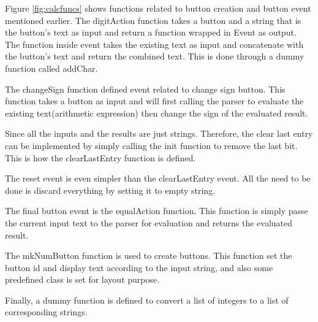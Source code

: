 \documentclass{article}
\begin{document}
\begin{normalsize}
  Figure \ref{fig:calcfuncs} shows functions related to button creation and button event mentioned earlier. The digitAction function takes a button and a string that is the button's text as input and return a function wrapped in Event as output. The function inside event takes the existing text as input and concatenate with the button's text and return the combined text. This is done through a dummy function called addChar.

  The changeSign function defined event related to change sign button. This function takes a button as input and will first calling the parser to evaluate the existing text(arithmetic expression) then change the sign of the evaluated result.

  Since all the inputs and the results are just strings. Therefore, the clear last entry can be implemented by simply calling the init function to remove the last bit. This is how the clearLastEntry function is defined.

  The reset event is even simpler than the clearLastEntry event. All the need to be done is discard everything by setting it to empty string.

  The final button event is the equalAction function. This function is simply passe the current input text to the parser for evaluation and returns the evaluated result.

  The mkNumButton function is used to create buttons. This function set the button id and display text according to the input string, and also some predefined class is set for layout purpose.
  
  Finally, a dummy function is defined to convert a list of integers to a list of corresponding strings.


\end{normalsize}
\end{document}
